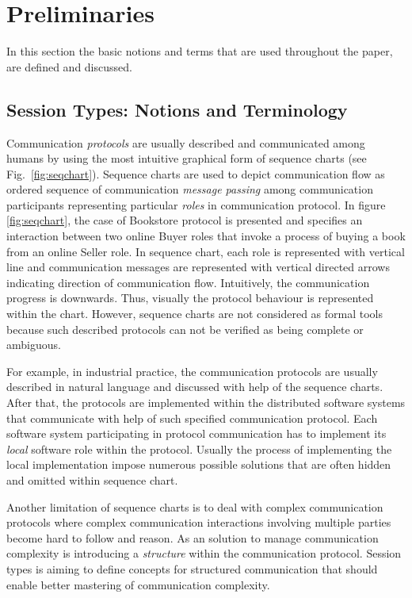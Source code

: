 \section{Preliminaries}
\label{sec:preliminaries}

In this section the basic notions and terms that are used throughout
the paper, are defined and discussed.

\subsection{Session Types: Notions and Terminology}

Communication \emph{protocols} are usually described and communicated among humans by using the most intuitive graphical form of sequence charts (see Fig.~\ref{fig:seqchart}). Sequence charts are used to depict communication flow as ordered sequence of communication \emph{message passing} among communication participants representing particular \emph{roles} in communication protocol. In figure \ref{fig:seqchart}, the case of Bookstore protocol is presented and specifies an interaction between two online Buyer roles that invoke a process of buying a book from an online Seller role. In sequence chart, each role is represented with vertical line and communication messages are represented with vertical directed arrows indicating direction of communication flow. Intuitively, the communication progress is downwards. Thus, visually the protocol behaviour is represented within the chart. However, sequence charts are not considered as formal tools because such described protocols can not be verified as being complete or ambiguous. 

For example, in industrial practice, the communication protocols are usually described in natural language and discussed with help of the sequence charts. After that, the protocols are implemented within the distributed software systems that communicate with help of such specified communication protocol. Each software system participating in protocol communication has to implement its \emph{local} software role within the protocol. Usually the process of implementing the local implementation impose numerous possible solutions that are often hidden and omitted within sequence chart.

Another limitation of sequence charts is to deal with complex communication protocols where complex communication interactions involving multiple parties become hard to follow and reason. As an solution to manage communication complexity is introducing a \emph{structure} within the communication protocol. Session types is aiming to define concepts for structured communication that should enable better mastering of communication complexity.

